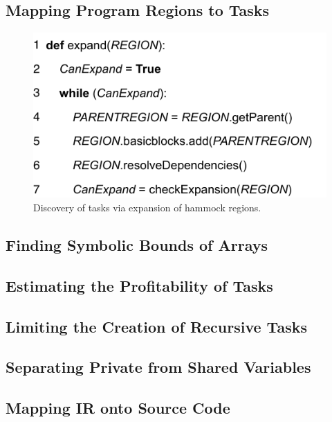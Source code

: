 \documentclass[sigplan,10pt,review,anonymous]{acmart}
\begin{document}
\subsection{Mapping Program Regions to Tasks}
\label{sub:identification}


\begin{figure}[t!]
\begin{center}
\includegraphics[width=0.9\columnwidth]{images/expand_alg}
\caption{Discovery of tasks via expansion of hammock regions.}
\label{fig:expand_alg}
\end{center}
\end{figure}


\subsection{Finding Symbolic Bounds of Arrays}
\label{sub:symb}

\subsection{Estimating the Profitability of Tasks}
\label{sub:profit}

\subsection{Limiting the Creation of Recursive Tasks}
\label{sub:rec}

\subsection{Separating Private from Shared Variables}
\label{sub:variance}

\subsection{Mapping IR onto Source Code}
\label{sub:ir}
\end{document}
